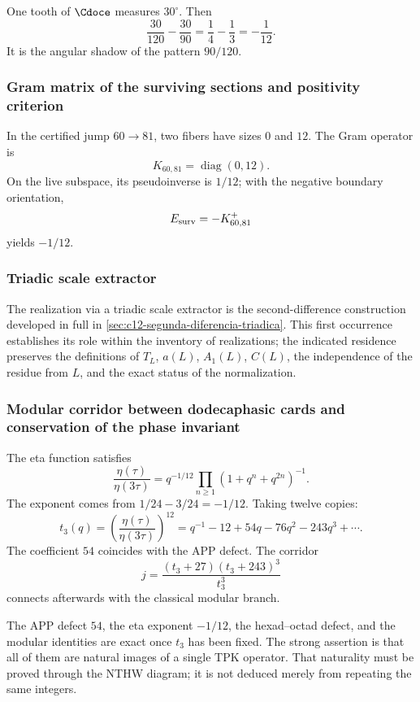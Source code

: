 One tooth of \(\Cdoce\) measures \(30^\circ\). Then
\[
\frac{30}{120}-\frac{30}{90}
=\frac14-\frac13
=-\frac1{12}.
\]
It is the angular shadow of the pattern \(90/120\).

\subsubsection{Gram matrix of the surviving sections and positivity criterion}

In the certified jump \(60\to81\), two fibers have sizes \(0\) and
\(12\). The Gram operator is
\[
K_{60,81}=\operatorname{diag}(0,12).
\]
On the live subspace, its pseudoinverse is \(1/12\); with the negative
boundary orientation,
\[
E_{\rm surv}=-K_{60,81}^{+}
\]
yields \(-1/12\).

\subsubsection{Triadic scale extractor}

The realization via a triadic scale extractor is the second-difference construction
developed in full in
\cref{sec:c12-segunda-diferencia-triadica}. This first occurrence establishes its
role within the inventory of realizations; the indicated residence preserves
the definitions of \(T_L\), \(a(L)\), \(A_1(L)\), \(C(L)\), the independence
of the residue from \(L\), and the exact status of the normalization.

\subsubsection{Modular corridor between dodecaphasic cards and conservation of the phase invariant}

The eta function satisfies
\[
\frac{\eta(\tau)}{\eta(3\tau)}
=q^{-1/12}\prod_{n\ge1}(1+q^n+q^{2n})^{-1}.
\]
The exponent comes from \(1/24-3/24=-1/12\). Taking twelve copies:
\[
t_3(q)=\left(\frac{\eta(\tau)}{\eta(3\tau)}\right)^{12}
=q^{-1}-12+54q-76q^2-243q^3+\cdots.
\]
The coefficient \(54\) coincides with the APP defect. The corridor
\[
j=\frac{(t_3+27)(t_3+243)^3}{t_3^3}
\]
connects afterwards with the classical modular branch.

\begin{exactbox}[title={What has been proved in the corridor}]
The APP defect \(54\), the eta exponent \(-1/12\), the
hexad--octad defect, and the modular identities are exact once \(t_3\) has been fixed. The
strong assertion is that all of them are natural images of a single
TPK operator. That naturality must be proved through the NTHW diagram; it is not
deduced merely from repeating the same integers.
\end{exactbox}

